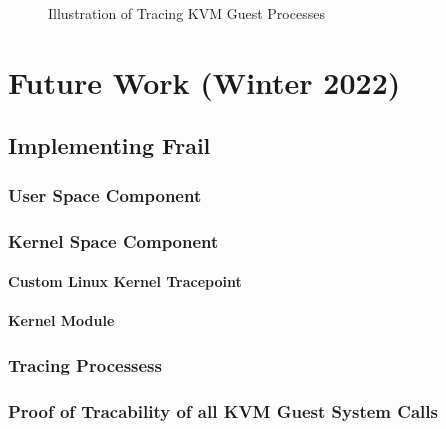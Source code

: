 \documentclass{report}
\begin{document}
\begin{spacing}{1.5}
\newpage
\vfill
{}
\begin{figure}[ht]
\centering
  \caption{Illustration of Tracing KVM Guest Processes}
\end{figure}






\chapter{Future Work (Winter 2022)}

\section{Implementing Frail}

\subsection{User Space Component}
\subsection{Kernel Space Component}
\subsubsection{Custom Linux Kernel Tracepoint}
\subsubsection{Kernel Module}
\subsection{Tracing Processess}
\subsection{Proof of Tracability of all KVM Guest System Calls}











\end{spacing}
\end{document}
